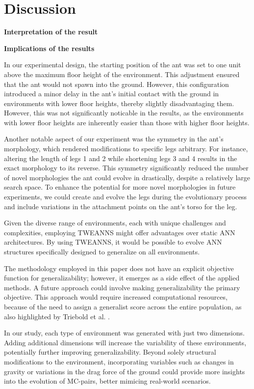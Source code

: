 \section{Discussion}

\textbf{Interpretation of the result}

\textbf{Implications of the results}

In our experimental design, the starting position of the ant was set to one unit above the maximum floor height of the environment. This adjustment ensured that the ant would not spawn into the ground. However, this configuration introduced a minor delay in the ant's initial contact with the ground in environments with lower floor heights, thereby slightly disadvantaging them. However, this was not significantly noticable in the results, as the environments with lower floor heights are inherently easier than those with higher floor heights.

Another notable aspect of our experiment was the symmetry in the ant's morphology, which rendered modifications to  specific legs arbitrary. For instance, altering the length of legs 1 and 2 while shortening legs 3 and 4 results in the exact morphology to its reverse. This symmetry significantly reduced the number of novel morphologies the ant could evolve in drastically, despite a relatively large search space. To enhance the potential for more novel morphologies in future experiments, we could create and evolve the legs during the evolutionary process and include variations in the attachment points on the ant's torso for the leg. 

Given the diverse range of environments, each with unique challenges and complexities, employing TWEANNS might offer advantages over static ANN architectures. By using TWEANNS, it would be possible to evolve ANN structures specifically designed to generalize on all environments.

The methodology employed in this paper does not have an explicit objective function for generalizability; however, it emerges as a side effect of the applied methods. A future approach could involve making generalizability the primary objective. This approach would require increased computational resources, because of the need to assign a generalist score across the entire population, as also highlighted by Triebold et al. \cite{Corinna_Triebold}.

In our study, each type of environment was generated with just two dimensions. Adding additional dimensions will increase the variability of these environments, potentially further improving generalizability. Beyond solely structural modifications to the environment, incorporating variables such as changes in gravity or variations in the drag force of the ground could provide more insights into the evolution of MC-pairs, better mimicing real-world scenarios.